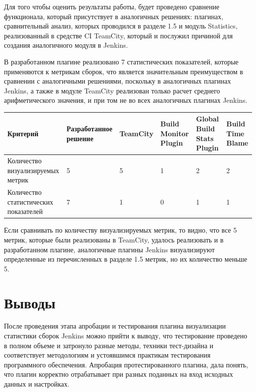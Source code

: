  Для того чтобы оценить результаты работы, будет проведено сравнение функционала, который присутствует в аналогичных решениях: плагинах, сравнительный анализ, которых проводился в разделе 1.5 и модуль Statistics, реализованный в средстве CI TeamCity, который и послужил причиной для создания аналогичного модуля в Jenkins.
 
 
 


В разработанном плагине реализовано 7 статистических показателей, которые применяются к метрикам сборок, что является значительным преимуществом в сравнении с аналогичными решениями, поскольку в аналогичных плагинах Jenkins, а также в модуле TeamCity реализован только расчет среднего арифметического значения, и при том не во всех аналогичных плагинах Jenkins.

 \begin{table}
    \centering
    \begin{tabular}{|p{3cm}|p{3cm}|p{2cm}|p{2cm}|p{2cm}|p{2cm}|}
    \hline
        Критерий & Разработанное решение & TeamCity & Build Monitor Plugin & Global Build Stats Plugin  & Build Time Blame \\ \hline
        Количество визуализируемых метрик & 5 & 5 & 1 & 2 &2 \\ \hline
        Количество статистических показателей & 7 & 1 & 0 & 1 &1\\ \hline


    \end{tabular}
\end{table}

Если сравнивать по количеству визуализируемых метрик, то видно, что все 5 метрик, которые были реализованы в TeamCity, удалось реализовать и в разработанном плагине, аналогичные плагины Jenkins визуализируют определенные из перечисленных в разделе 1.5 метрик, но их количество меньше 5.


 
 
\section{Выводы} \label{ch4:sec3}

После проведения этапа апробации и тестирования плагина визуализации статистики сборок Jenkins можно прийти к выводу, что тестирование проведено в полном объеме и затронуло разные методы, техники тест-дизайна и соответствует методологиям и устоявшимся практикам тестирования программного обеспечения. Апробация протестированного плагина, дала понять, что плагин корректно отрабатывает при разных поданных на вход исходных данных и настройках.






